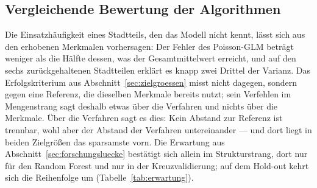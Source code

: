 \documentclass[12pt,a4paper]{article}
\begin{document}
%

\subsection{Vergleichende Bewertung der Algorithmen}
\label{sec:diskussion-verfahren}

Die Einsatzhäufigkeit eines Stadtteils, den das Modell nicht kennt, lässt sich aus den erhobenen Merkmalen vorhersagen: Der Fehler des Poisson-GLM beträgt weniger als die Hälfte dessen, was der Gesamtmittelwert erreicht, und auf den sechs zurückgehaltenen Stadtteilen erklärt es knapp zwei Drittel der Varianz. Das Erfolgskriterium aus Abschnitt~\ref{sec:zielgroessen} misst nicht dagegen, sondern gegen eine Referenz, die dieselben Merkmale bereits nutzt; sein Verfehlen im Mengenstrang sagt deshalb etwas über die Verfahren und nichts über die Merkmale. Über die Verfahren sagt es dies: Kein Abstand zur Referenz ist trennbar, wohl aber der Abstand der Verfahren untereinander --- und dort liegt in beiden Zielgrößen das sparsamste vorn. Die Erwartung aus Abschnitt~\ref{sec:forschungsluecke} bestätigt sich allein im Strukturstrang, dort nur für den Random Forest und nur in der Kreuzvalidierung; auf dem Hold-out kehrt sich die Reihenfolge um (Tabelle~\ref{tab:erwartung}).
\end{document}
